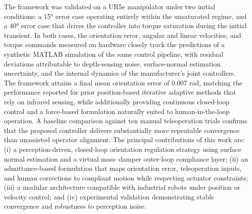 The framework was validated on a UR5e manipulator under two initial conditions: a 15° error case operating entirely within the unsaturated regime, and a 40° error case that drives the controller into torque saturation during the initial transient. In both cases, the orientation error, angular and linear velocities, and torque commands measured on hardware closely track the predictions of a synthetic MATLAB simulation of the same control pipeline, with residual deviations attributable to depth-sensing noise, surface-normal estimation uncertainty, and the internal dynamics of the manufacturer's joint controllers. The framework attains a final mean orientation error of 0.007 rad, matching the performance reported for prior position-based iterative adaptive methods that rely on infrared sensing, while additionally providing continuous closed-loop control and a force-based formulation naturally suited to human-in-the-loop operation. A baseline comparison against ten manual teleoperation trials confirms that the proposed controller delivers substantially more repeatable convergence than unassisted operator alignment.
The principal contributions of this work are: (i) a perception-driven, closed-loop orientation regulation strategy using surface normal estimation and a virtual mass–damper outer-loop compliance layer; (ii) an admittance-based formulation that maps orientation error, teleoperation inputs, and human corrections to compliant motion while respecting actuator constraints; (iii) a modular architecture compatible with industrial robots under position or velocity control; and (iv) experimental validation demonstrating stable convergence and robustness to perception noise.